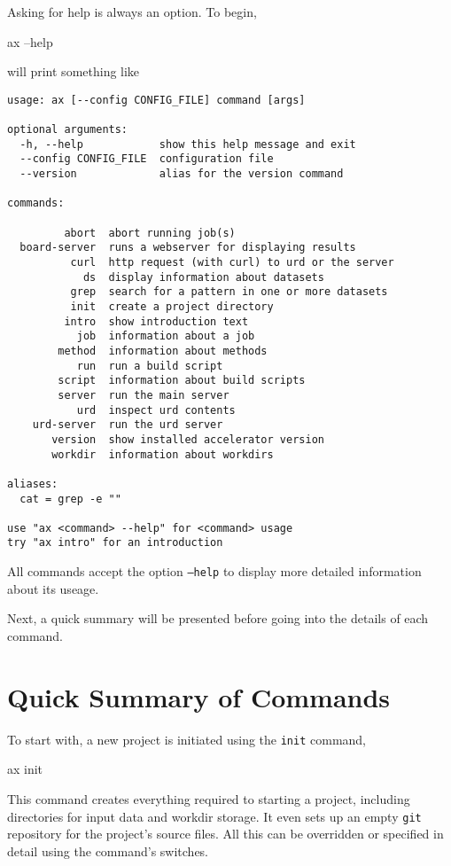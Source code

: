 Asking for help is always an option.  To begin,
\begin{shell}
ax --help
\end{shell}
will print something like
\begin{snugshade}
\begin{verbatim}
usage: ax [--config CONFIG_FILE] command [args]

optional arguments:
  -h, --help            show this help message and exit
  --config CONFIG_FILE  configuration file
  --version             alias for the version command

commands:

         abort  abort running job(s)
  board-server  runs a webserver for displaying results
          curl  http request (with curl) to urd or the server
            ds  display information about datasets
          grep  search for a pattern in one or more datasets
          init  create a project directory
         intro  show introduction text
           job  information about a job
        method  information about methods
           run  run a build script
        script  information about build scripts
        server  run the main server
           urd  inspect urd contents
    urd-server  run the urd server
       version  show installed accelerator version
       workdir  information about workdirs

aliases:
  cat = grep -e ""

use "ax <command> --help" for <command> usage
try "ax intro" for an introduction
\end{verbatim}
\end{snugshade}
\noindent All commands accept the option \texttt{--help} to display
more detailed information about its useage.

Next, a quick summary will be presented before going into
the details of each command.


\section{Quick Summary of Commands}
To start with, a new project is initiated using the \texttt{init}
command,
\begin{shell}
ax init
\end{shell}
This command creates everything required to starting a project,
including directories for input data and workdir storage.  It even
sets up an empty \texttt{git} repository for the project's source
files.  All this can be overridden or specified in detail using the
command's switches.

